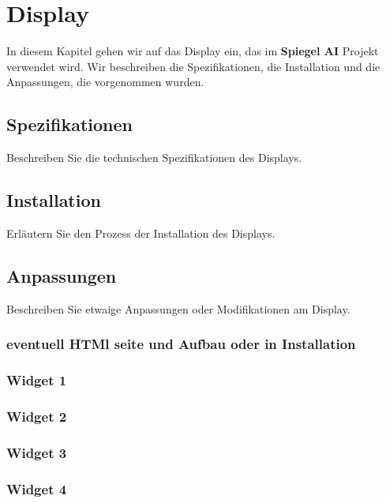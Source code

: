 \chapter{Display}

In diesem Kapitel gehen wir auf das Display ein, das im \textbf{Spiegel AI} Projekt verwendet wird. Wir beschreiben die Spezifikationen, die Installation und die Anpassungen, die vorgenommen wurden.

\section{Spezifikationen}
Beschreiben Sie die technischen Spezifikationen des Displays.

\section{Installation}
Erläutern Sie den Prozess der Installation des Displays.

\section{Anpassungen}
Beschreiben Sie etwaige Anpassungen oder Modifikationen am Display.

\subsection{eventuell HTMl seite und Aufbau oder in Installation}
\subsection{Widget 1}
\subsection{Widget 2}
\subsection{Widget 3}
\subsection{Widget 4}
